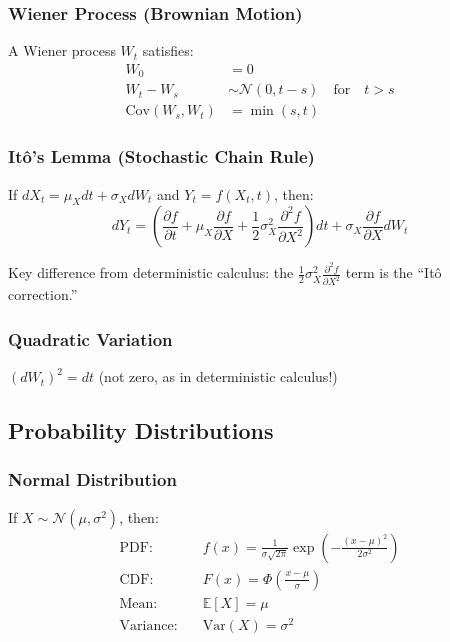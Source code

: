 \documentclass[12pt,a4paper]{article}
\begin{document}
\subsubsection{Wiener Process (Brownian Motion)}

A Wiener process $W_t$ satisfies:
\begin{align}
W_0 &= 0 \\
W_t - W_s &\sim \mathcal{N}(0, t-s) \quad \text{for} \quad t > s \\
\text{Cov}(W_s, W_t) &= \min(s, t)
\end{align}

\subsubsection{Itô's Lemma (Stochastic Chain Rule)}

If $dX_t = \mu_X dt + \sigma_X dW_t$ and $Y_t = f(X_t, t)$, then:
\begin{equation}
dY_t = \left(\frac{\partial f}{\partial t} + \mu_X \frac{\partial f}{\partial X} + \frac{1}{2} \sigma_X^2 \frac{\partial^2 f}{\partial X^2}\right) dt + \sigma_X \frac{\partial f}{\partial X} dW_t
\end{equation}

Key difference from deterministic calculus: the $\frac{1}{2} \sigma_X^2 \frac{\partial^2 f}{\partial X^2}$ term is the ``Itô correction.''

\subsubsection{Quadratic Variation}

$(dW_t)^2 = dt$ (not zero, as in deterministic calculus!)

\subsection{Probability Distributions}

\subsubsection{Normal Distribution}

If $X \sim \mathcal{N}(\mu, \sigma^2)$, then:
\begin{align}
\text{PDF}: & \quad f(x) = \frac{1}{\sigma\sqrt{2\pi}} \exp\left(-\frac{(x-\mu)^2}{2\sigma^2}\right) \\
\text{CDF}: & \quad F(x) = \Phi\left(\frac{x-\mu}{\sigma}\right) \\
\text{Mean}: & \quad \mathbb{E}[X] = \mu \\
\text{Variance}: & \quad \text{Var}(X) = \sigma^2
\end{align}
\end{document}
